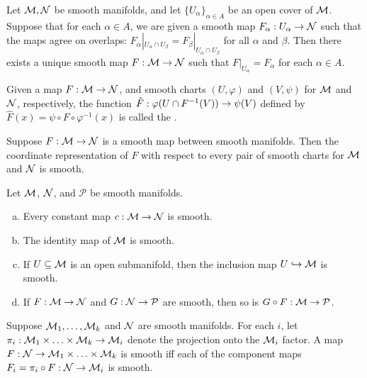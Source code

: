 \documentclass[11pt,a4paper]{article}
\begin{document}
\begin{prop}
Let $\mathcal{M},\mathcal{N}$ be smooth manifolds, and let $\{U_\alpha\}_{\alpha\in A}$ be an open cover of $\mathcal{M}$. Suppose that for each $\alpha\in A$, we are given a smooth map $F_\alpha:U_\alpha\rightarrow \mathcal{N}$ such that the maps agree on overlaps: $F_\alpha|_{U_\alpha\cap U_\beta} = F_\beta|_{U_\alpha\cap U_\beta}$ for all $\alpha$ and $\beta$. Then there exists a unique smooth map $F:\mathcal{M}\rightarrow \mathcal{N}$ such that $F|_{U_\alpha} = F_\alpha$ for each $\alpha\in A$.
\end{prop}

\begin{definition}
Given a map $F:\mathcal{M}\rightarrow \mathcal{N}$, and smooth charts $(U,\varphi)$ and $(V,\psi)$ for $\mathcal{M}$ and $\mathcal{N}$, respectively, the function $\hat{F}:\varphi(U\cap F^{-1}(V))\rightarrow \psi(V)$ defined by $\hat{F}(x) = \psi\circ F\circ\varphi^{-1}(x)$ is called the .
\end{definition}

\begin{prop}
Suppose $F:\mathcal{M}\rightarrow \mathcal{N}$ is a smooth map between smooth manifolds. Then the coordinate representation of $F$ with respect to every pair of smooth charts for $\mathcal{M}$ and $\mathcal{N}$ is smooth.
\end{prop}

\begin{prop}
Let $\mathcal{M}$, $\mathcal{N}$, and $\mathcal{P}$ be smooth manifolds.
\begin{enumerate}[(a)]
    \item Every constant map $c:\mathcal{M}\rightarrow \mathcal{N}$ is smooth.
    \item The identity map of $\mathcal{M}$ is smooth.
    \item If $U \subseteq \mathcal{M}$ is an open submanifold, then the inclusion map $U\hookrightarrow \mathcal{M}$ is smooth.
    \item If $F:\mathcal{M}\rightarrow \mathcal{N}$ and $G:\mathcal{N}\rightarrow \mathcal{P}$ are smooth, then so is $G\circ F:\mathcal{M}\rightarrow \mathcal{P}$.
\end{enumerate}
\end{prop}

\begin{prop}
Suppose $\mathcal{M}_1,\ldots, \mathcal{M}_k$ and $\mathcal{N}$ are smooth manifolds. For each $i$, let $\pi_i:\mathcal{M}_1\times\ldots\times\mathcal{M}_k\rightarrow \mathcal{M}_i$ denote the projection onto the $\mathcal{M}_i$ factor. A map $F:\mathcal{N}\rightarrow \mathcal{M}_1\times\ldots\times\mathcal{M}_k$ is smooth iff each of the component maps $F_i = \pi_i\circ F:\mathcal{N}\rightarrow \mathcal{M}_i$ is smooth.
\end{prop}
\end{document}
